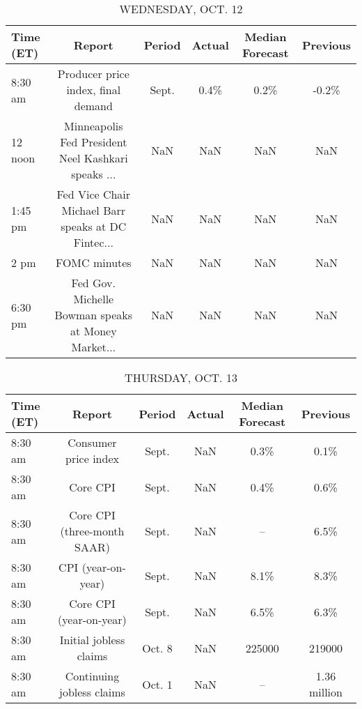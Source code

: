 \documentclass{article}%
\begin{document}
\begin{table}[htbp]%
\caption{WEDNESDAY, OCT. 12}%
\centering%
\begin{adjustbox}{width=1\textwidth}%
\begin{tabular}{lccccc}
\toprule
Time (ET) &                                             Report & Period & Actual & Median Forecast & Previous \\
\midrule
  8:30 am &                 Producer price index, final demand &  Sept. &   0.4\% &            0.2\% &    -0.2\% \\
  12 noon & Minneapolis Fed President Neel Kashkari speaks ... &    NaN &    NaN &             NaN &      NaN \\
  1:45 pm & Fed Vice Chair Michael Barr speaks at DC Fintec... &    NaN &    NaN &             NaN &      NaN \\
     2 pm &                                       FOMC minutes &    NaN &    NaN &             NaN &      NaN \\
  6:30 pm & Fed Gov. Michelle Bowman speaks at Money Market... &    NaN &    NaN &             NaN &      NaN \\
\bottomrule
\end{tabular}
%
\end{adjustbox}%
\end{table}

%


\begin{table}[htbp]%
\caption{THURSDAY, OCT. 13}%
\centering%
\begin{adjustbox}{width=1\textwidth}%
\begin{tabular}{lccccc}
\toprule
Time (ET) &                      Report & Period & Actual & Median Forecast &     Previous \\
\midrule
  8:30 am &        Consumer price index &  Sept. &    NaN &            0.3\% &         0.1\% \\
  8:30 am &                    Core CPI &  Sept. &    NaN &            0.4\% &         0.6\% \\
  8:30 am & Core CPI (three-month SAAR) &  Sept. &    NaN &              -- &         6.5\% \\
  8:30 am &          CPI (year-on-year) &  Sept. &    NaN &            8.1\% &         8.3\% \\
  8:30 am &     Core CPI (year-on-year) &  Sept. &    NaN &            6.5\% &         6.3\% \\
  8:30 am &      Initial jobless claims & Oct. 8 &    NaN &          225000 &       219000 \\
  8:30 am &   Continuing jobless claims & Oct. 1 &    NaN &              -- & 1.36 million \\
\bottomrule
\end{tabular}
%
\end{adjustbox}%
\end{table}
\end{document}
